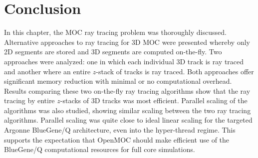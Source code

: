 %
\section{Conclusion} 
\label{sec:rt-conclusion}

In this chapter, the \ac{MOC} ray tracing problem was thoroughly discussed. Alternative approaches to ray tracing for 3D \ac{MOC} were presented whereby only 2D segments are stored and 3D segments are computed on-the-fly. Two approaches were analyzed: one in which each individual 3D track is ray traced and another where an entire $z$-stack of tracks is ray traced. Both approaches offer significant memory reduction with minimal or no computational overhead. Results comparing these two on-the-fly ray tracing algorithms show that the ray tracing by entire $z$-stacks of 3D tracks was most efficient. Parallel scaling of the algorithms was also studied, showing similar scaling between the two ray tracing algorithms. Parallel scaling was quite close to ideal linear scaling for the targeted Argonne BlueGene/Q architecture, even into the hyper-thread regime. This supports the expectation that OpenMOC should make efficient use of the BlueGene/Q computational resources for full core simulations.

